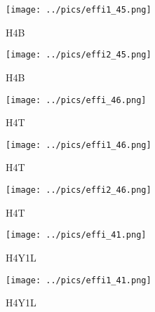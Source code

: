\documentclass[10pt, xcolor={dvipsnames}, aspectratio = 169]{beamer}
\begin{document}
\begin{frame}

\begin{figure}
\centering
\texttt{[image: ../pics/effi1\_45.png]}
\caption{H4B}
\end{figure}

\end{frame}


\begin{frame}

\begin{figure}
\centering
\texttt{[image: ../pics/effi2\_45.png]}
\caption{H4B}
\end{figure}

\end{frame}

\begin{frame}

\begin{figure}
\centering
\texttt{[image: ../pics/effi\_46.png]}
\caption{H4T}
\end{figure}

\end{frame}


\begin{frame}

\begin{figure}
\centering
\texttt{[image: ../pics/effi1\_46.png]}
\caption{H4T}
\end{figure}

\end{frame}


\begin{frame}

\begin{figure}
\centering
\texttt{[image: ../pics/effi2\_46.png]}
\caption{H4T}
\end{figure}

\end{frame}

\begin{frame}

\begin{figure}
\centering
\texttt{[image: ../pics/effi\_41.png]}
\caption{H4Y1L}
\end{figure}

\end{frame}


\begin{frame}

\begin{figure}
\centering
\texttt{[image: ../pics/effi1\_41.png]}
\caption{H4Y1L}
\end{figure}

\end{frame}
\end{document}

